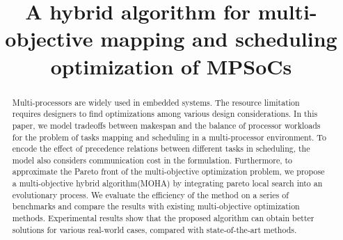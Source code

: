 \documentclass[conference]{IEEEtran}
\begin{document}

\title{A hybrid algorithm for multi-objective mapping and scheduling optimization of MPSoCs}

%
%


%
\maketitle
\begin{abstract}
Multi-processors are widely used in embedded systems. The resource limitation requires designers to find optimizations among various design considerations. In this paper, we model tradeoffs between makespan and the balance of processor workloads for the problem of tasks mapping and scheduling in a multi-processor environment. To encode the effect of precedence relations between different tasks in scheduling, the model also considers communication cost in the formulation. Furthermore, to approximate the Pareto front of the multi-objective optimization problem, we propose a multi-objective hybrid algorithm(MOHA) by integrating pareto local search into an evolutionary process. We evaluate the efficiency of the method on a series of benchmarks and compare the results with existing multi-objective optimization methods. Experimental results show that the proposed algorithm can obtain better solutions for various real-world cases, compared with state-of-the-art methods.

 \end{abstract}
\vspace{-5pt}


\end{document}
